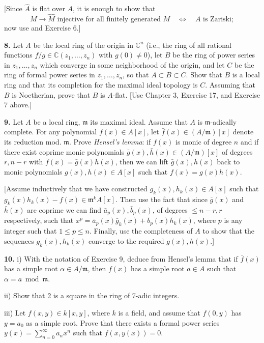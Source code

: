 [Since $\widehat A$ is flat over $A$, it is enough to show that
\[
M\longrightarrow\widehat M\text{ injective for all finitely generated }M\quad\Longleftrightarrow\quad A\text{ is Zariski};
\]
now use  and Exercise 6.]

\medskip
\noindent\textbf{8.} Let $A$ be the local ring of the origin in $\mathbb C^n$ (i.e., the ring of all rational functions
$f/g\in\mathbb C(z_1,\ldots,z_n)$ with $g(0)\ne0$), let $B$ be the ring of power series in $z_1,\ldots,z_n$
which converge in some neighborhood of the origin, and let $C$ be the ring of
formal power series in $z_1,\ldots,z_n$, so that $A\subset B\subset C$.  Show that $B$ is a local
ring and that its completion for the maximal ideal topology is $C$.  Assuming that
$B$ is Noetherian, prove that $B$ is $A$-flat.  [Use Chapter 3, Exercise 17, and
Exercise 7 above.]

\medskip
\noindent\textbf{9.} Let $A$ be a local ring, $\mathfrak m$ its maximal ideal.  Assume that $A$ is $\mathfrak m$-adically complete.
For any polynomial $f(x)\in A[x]$, let $\bar f(x)\in(A/\mathfrak m)[x]$ denote its reduction mod. $\mathfrak m$.
Prove \emph{Hensel's lemma}: if $f(x)$ is monic of degree $n$ and if there exist coprime
monic polynomials $\bar g(x),\bar h(x)\in(A/\mathfrak m)[x]$ of degrees $r,n-r$ with $\bar f(x)=
\bar g(x)\bar h(x)$, then we can lift $\bar g(x),\bar h(x)$ back to monic polynomials $g(x),h(x)\in A[x]$
such that $f(x)=g(x)h(x)$.

[Assume inductively that we have constructed $g_k(x),h_k(x)\in A[x]$ such that
$g_k(x)h_k(x)-f(x)\in\mathfrak m^kA[x]$.  Then use the fact that since $\bar g(x)$ and $\bar h(x)$ are
coprime we can find $\bar a_p(x),\bar b_p(x)$, of degrees $\leq n-r,r$ respectively, such that
$x^p=\bar a_p(x)\bar g_k(x)+\bar b_p(x)\bar h_k(x)$, where $p$ is any integer such that $1\leq p\leq n$.
Finally, use the completeness of $A$ to show that the sequences $g_k(x),h_k(x)$
converge to the required $g(x),h(x)$.]

\medskip
\noindent\textbf{10.} i) With the notation of Exercise 9, deduce from Hensel's lemma that if $\bar f(x)$
has a simple root $\alpha\in A/\mathfrak m$, then $f(x)$ has a simple root $a\in A$ such that
$\alpha=a\bmod\mathfrak m$.

ii) Show that 2 is a square in the ring of 7-adic integers.

iii) Let $f(x,y)\in k[x,y]$, where $k$ is a field, and assume that $f(0,y)$ has $y=a_0$
as a simple root.  Prove that there exists a formal power series $y(x)=
\sum_{n=0}^\infty a_nx^n$ such that $f(x,y(x))=0$.

